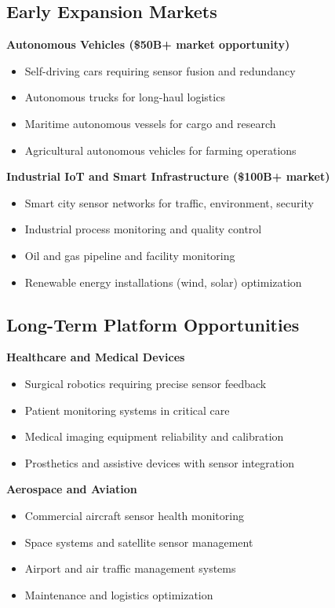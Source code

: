 \documentclass[11pt,letterpaper]{article}
\begin{document}
\subsection*{Early Expansion Markets}

\textbf{Autonomous Vehicles (\$50B+ market opportunity)}
\begin{itemize}[leftmargin=10pt, itemsep=1pt]
    \item Self-driving cars requiring sensor fusion and redundancy
    \item Autonomous trucks for long-haul logistics
    \item Maritime autonomous vessels for cargo and research
    \item Agricultural autonomous vehicles for farming operations
\end{itemize}

\textbf{Industrial IoT and Smart Infrastructure (\$100B+ market)}
\begin{itemize}[leftmargin=10pt, itemsep=1pt]
    \item Smart city sensor networks for traffic, environment, security
    \item Industrial process monitoring and quality control
    \item Oil and gas pipeline and facility monitoring
    \item Renewable energy installations (wind, solar) optimization
\end{itemize}

\subsection*{Long-Term Platform Opportunities}

\textbf{Healthcare and Medical Devices}
\begin{itemize}[leftmargin=10pt, itemsep=1pt]
    \item Surgical robotics requiring precise sensor feedback
    \item Patient monitoring systems in critical care
    \item Medical imaging equipment reliability and calibration
    \item Prosthetics and assistive devices with sensor integration
\end{itemize}

\textbf{Aerospace and Aviation}
\begin{itemize}[leftmargin=10pt, itemsep=1pt]
    \item Commercial aircraft sensor health monitoring
    \item Space systems and satellite sensor management
    \item Airport and air traffic management systems
    \item Maintenance and logistics optimization
\end{itemize}
\end{document}
